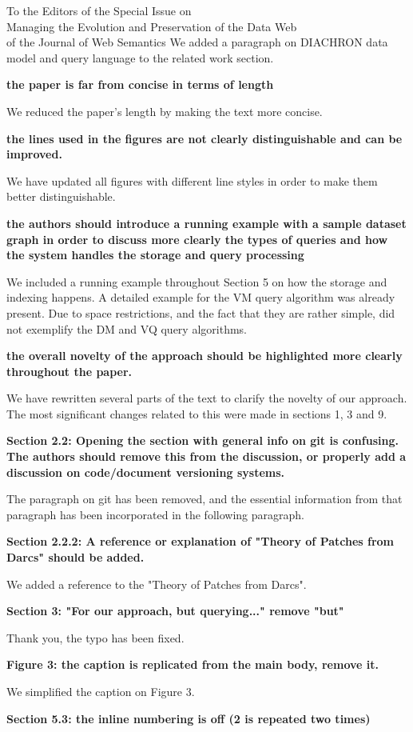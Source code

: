\documentclass{letter}
\newcounter{section}
\begin{document}
\begin{letter}{To the Editors of the Special Issue on\\Managing the Evolution and Preservation of the Data Web\\of the Journal of Web Semantics}
We added a paragraph on DIACHRON data model and query language to the related work section.

\textbf{the paper is far from concise in terms of length}

We reduced the paper's length by making the text more concise.

\textbf{the lines used in the figures are not clearly distinguishable and can be improved.}

We have updated all figures with different line styles in order to make them better distinguishable.

\textbf{the authors should introduce a running example with a sample dataset graph in order to discuss more clearly the types of queries and how the system handles the storage and query processing}

We included a running example throughout Section 5 on how the storage and indexing happens.
A detailed example for the VM query algorithm was already present.
Due to space restrictions, and the fact that they are rather simple, did not exemplify the DM and VQ query algorithms.

\pagebreak
\textbf{the overall novelty of the approach should be highlighted more clearly throughout the paper.}

We have rewritten several parts of the text to clarify the novelty of our approach.
The most significant changes related to this were made in sections 1, 3 and 9.

\textbf{Section 2.2: Opening the section with general info on git is confusing. The authors should remove this from the discussion, or properly add a discussion on code/document versioning systems. }

The paragraph on git has been removed, and the essential information from that paragraph has been incorporated in the following paragraph.

\textbf{Section 2.2.2: A reference or explanation of "Theory of Patches from Darcs" should be added. }

We added a reference to the "Theory of Patches from Darcs".

\textbf{Section 3: "For our approach, but querying..." remove "but" }

Thank you, the typo has been fixed.

\textbf{Figure 3: the caption is replicated from the main body, remove it. }

We simplified the caption on Figure 3.

\textbf{Section 5.3: the inline numbering is off (2 is repeated two times) }


\end{letter}
\end{document}
